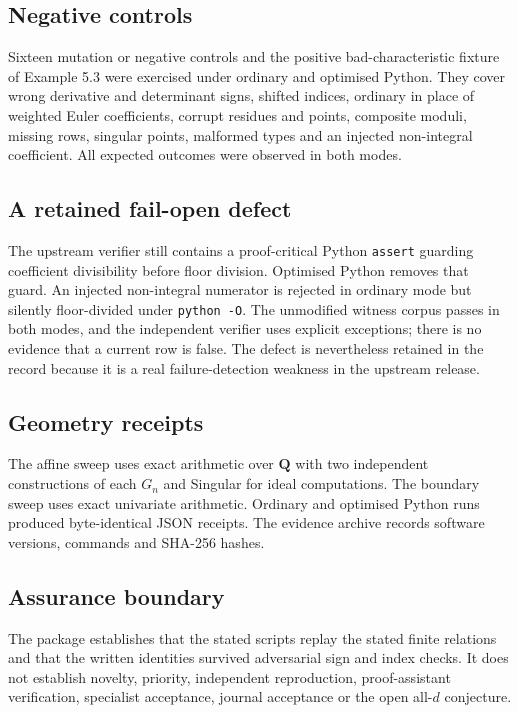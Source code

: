 \documentclass[
]{article}
\begin{document}
\subsection{Negative controls}\label{negative-controls}

Sixteen mutation or negative controls and the positive
bad-characteristic fixture of Example 5.3 were exercised under ordinary
and optimised Python. They cover wrong derivative and determinant signs,
shifted indices, ordinary in place of weighted Euler coefficients,
corrupt residues and points, composite moduli, missing rows, singular
points, malformed types and an injected non-integral coefficient. All
expected outcomes were observed in both modes.

\subsection{A retained fail-open
defect}\label{a-retained-fail-open-defect}

The upstream verifier still contains a proof-critical Python
\texttt{assert} guarding coefficient divisibility before floor division.
Optimised Python removes that guard. An injected non-integral numerator
is rejected in ordinary mode but silently floor-divided under
\texttt{python\ -O}. The unmodified witness corpus passes in both modes,
and the independent verifier uses explicit exceptions; there is no
evidence that a current row is false. The defect is nevertheless
retained in the record because it is a real failure-detection weakness
in the upstream release.

\subsection{Geometry receipts}\label{geometry-receipts}

The affine sweep uses exact arithmetic over \(\mathbf Q\) with two
independent constructions of each \(G_n\) and Singular for ideal
computations. The boundary sweep uses exact univariate arithmetic.
Ordinary and optimised Python runs produced byte-identical JSON
receipts. The evidence archive records software versions, commands and
SHA-256 hashes.

\subsection{Assurance boundary}\label{assurance-boundary}

The package establishes that the stated scripts replay the stated finite
relations and that the written identities survived adversarial sign and
index checks. It does not establish novelty, priority, independent
reproduction, proof-assistant verification, specialist acceptance,
journal acceptance or the open all-\(d\) conjecture.
\end{document}

